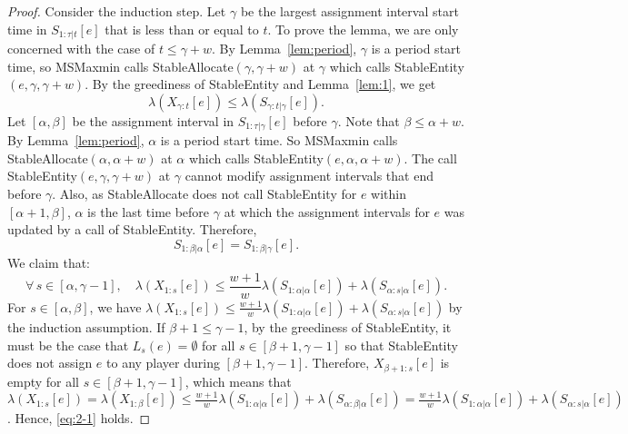 \documentclass[11pt,a4paper]{article}
\renewcommand{\leq}{\leqslant}
\begin{document}
\begin{proof}
	Consider the induction step.  Let $\gamma$ be the largest assignment interval start time in $S_{1:\tau|t}[e]$ that is less than or equal to $t$.   To prove the lemma, we are only concerned with the case of $t \leq \gamma+w$.   
	By Lemma~\ref{lem:period}, $\gamma$ is a period start time, so MSMaxmin calls StableAllocate$(\gamma,\gamma+w)$ at $\gamma$ which calls StableEntity$(e,\gamma,\gamma+w)$.   By the greediness of StableEntity and Lemma~\ref{lem:1}, we get 
	\begin{equation}
		\lambda(X_{\gamma:t}[e]) \leq \lambda(S_{\gamma:t|\gamma}[e]).  \label{eq:2-4}
	\end{equation}
	Let $[\alpha,\beta]$ be the assignment interval in $S_{1:\tau|\gamma}[e]$ before $\gamma$.   Note that $\beta \leq \alpha+w$.  By Lemma~\ref{lem:period}, $\alpha$ is a period start time.  So MSMaxmin calls StableAllocate$(\alpha,\alpha+w)$ at $\alpha$ which calls StableEntity$(e,\alpha,\alpha+w)$.  The call StableEntity$(e,\gamma,\gamma+w)$ at $\gamma$ cannot modify assignment intervals that end before $\gamma$.  Also, as StableAllocate does not call StableEntity for $e$ within $[\alpha+1,\beta]$, $\alpha$ is the last time before $\gamma$ at which the assignment intervals for $e$ was updated by a call of StableEntity.  Therefore,
	\begin{equation}	
		S_{1:\beta|\alpha}[e] = S_{1:\beta|\gamma}[e].   \label{eq:2-2-1}
	\end{equation} 
	We claim that:
	\begin{equation}
		\forall\, s \in [\alpha,\gamma-1], \quad \lambda(X_{1:s}[e]) \leq \frac{w+1}{w}\lambda(S_{1:\alpha|\alpha}[e]) + \lambda(S_{\alpha:s|\alpha}[e]).
		\label{eq:2-1}
	\end{equation}
	For $s \in [\alpha,\beta]$, we have $\lambda(X_{1:s}[e]) \leq \frac{w+1}{w}\lambda(S_{1:\alpha|\alpha}[e]) + \lambda(S_{\alpha:s|\alpha}[e])$ by the induction assumption.  If $\beta+1\leq \gamma-1$, by the greediness of StableEntity, it must be the case that $L_s(e) = \emptyset$ for all $s \in [\beta+1,\gamma-1]$ so that StableEntity does not assign $e$ to any player during $[\beta+1,\gamma-1]$.  Therefore, $X_{\beta+1:s}[e]$ is empty for all $s \in [\beta+1,\gamma-1]$, which means that $\lambda(X_{1:s}[e]) = \lambda(X_{1:\beta}[e]) \leq \frac{w+1}{w}\lambda(S_{1:\alpha|\alpha}[e]) + \lambda(S_{\alpha:\beta|\alpha}[e]) =  \frac{w+1}{w}\lambda(S_{1:\alpha|\alpha}[e]) + \lambda(S_{\alpha:s|\alpha}[e])$.  Hence, \eqref{eq:2-1} holds.
	

\end{proof}
\end{document}
